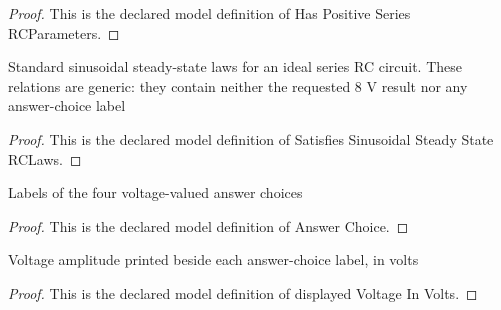 \begin{proof}
  This is the declared model definition of Has Positive Series RCParameters.
\end{proof}
\begin{definition}
  \label{def:physics:phyx-mini-0887:phyxminiproblems-problemphyxmini0887-satisfiessinusoidalsteadystaterclaws}
  Standard sinusoidal steady-state laws for an ideal series RC circuit. These relations are generic: they contain neither the requested 8 V result nor any answer-choice label
\end{definition}
\begin{proof}
  This is the declared model definition of Satisfies Sinusoidal Steady State RCLaws.
\end{proof}
\begin{definition}
  \label{def:physics:phyx-mini-0887:phyxminiproblems-problemphyxmini0887-answerchoice}
  Labels of the four voltage-valued answer choices
\end{definition}
\begin{proof}
  This is the declared model definition of Answer Choice.
\end{proof}
\begin{definition}
  \label{def:physics:phyx-mini-0887:phyxminiproblems-problemphyxmini0887-answerchoice-displayedvoltageinvolts}
  Voltage amplitude printed beside each answer-choice label, in volts
\end{definition}
\begin{proof}
  This is the declared model definition of displayed Voltage In Volts.
\end{proof}
